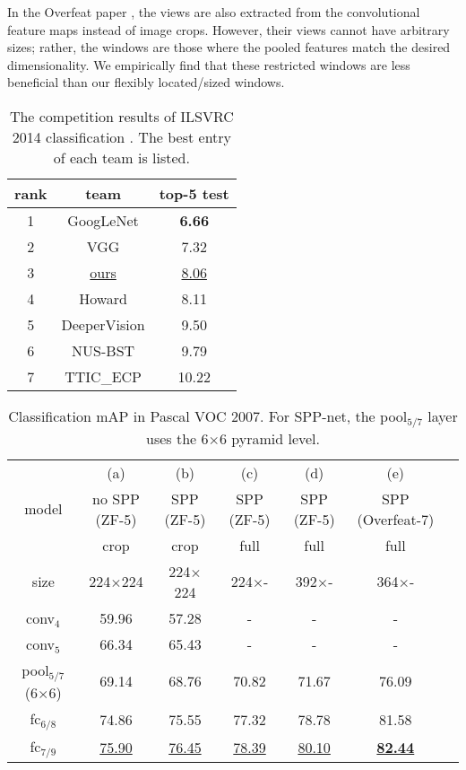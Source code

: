 \documentclass[10pt,journal,cspaper,compsoc]{IEEEtran}
\begin{document}
In the Overfeat paper \cite{Sermanet2013}, the views are also extracted from the convolutional feature maps instead of image crops. However, their views cannot have arbitrary sizes; rather, the windows are those where the pooled features match the desired dimensionality. We empirically find that these restricted windows are less beneficial than our flexibly located/sized windows.

\setlength{\tabcolsep}{8pt}
\begin{table}[t]
\small
\begin{center}
\begin{tabular}{cc|c}
\hline
rank & team & top-5 test\\
\hline
1 &  GoogLeNet \cite{Szegedy2014} & \textbf{6.66}\\
2 & VGG \cite{Simonyan2014} & 7.32\\
3 & \underline{ours} & \underline{8.06}\\
4 & Howard & 8.11\\
5 & DeeperVision & 9.50\\
6 & NUS-BST & 9.79\\
7 & TTIC\_ECP & 10.22\\
\hline
\end{tabular}
\caption{The competition results of ILSVRC 2014 classification \cite{Russakovsky2014}. The best entry of each team is listed.}
\label{tab:ilsvrc14_CLS}
\end{center}
\end{table}

\setlength{\tabcolsep}{4pt}
\begin{table*}[t]
\footnotesize
\begin{center}
\begin{tabular}{c|cccccc}
\hline
      & (a)       & (b) & (c) & (d) & (e)\\
model & no SPP (ZF-5) & SPP (ZF-5) & SPP (ZF-5) & SPP (ZF-5) & SPP (Overfeat-7)\\
\hline
     &                    crop     &    crop    &  full & full & full\\
size &                224$\times$224 & 224$\times$224 & 224$\times$- & 392$\times$- & 364$\times$- \\
\hline
conv$_4$ &                59.96 & 57.28 & -  & - & - \\
conv$_5$ &                66.34 & 65.43 & -  & - & - \\
pool$_{5/7}$ (6$\times$6) &   69.14 & 68.76 & 70.82 & 71.67 & 76.09 \\
fc$_{6/8}$ &                  74.86 & 75.55 & 77.32 & 78.78 & 81.58 \\
fc$_{7/9}$ &                  \underline{75.90} & \underline{76.45} & \underline{78.39} & \underline{80.10} & \underline{\textbf{82.44}} \\
\hline
\end{tabular}
\end{center}
\caption{Classification mAP in Pascal VOC 2007. For SPP-net, the pool$_{5/7}$ layer uses the 6$\times$6 pyramid level.}
\label{tab:voc2007}
\end{table*}
\end{document}
